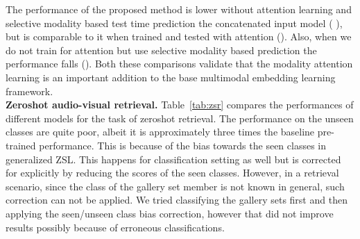 The performance of the proposed method is lower without attention learning and selective modality based test time prediction \cf the concatenated input model ( \vs ), but is comparable to it when trained and tested with attention (). Also, when we do not train for attention but use selective modality based prediction the performance falls (). Both these comparisons validate that the modality attention learning is an important addition to the base multimodal embedding learning framework.
\vspace{0.5em}\\
\textbf{Zeroshot audio-visual retrieval.}
Table~\ref{tab:zsr} compares the performances of different models for the task of zeroshot retrieval. 
The performance on the unseen classes are quite poor, albeit it is approximately three times the baseline pre-trained performance. This is because of the bias towards the seen classes in generalized ZSL. This happens for classification setting as well but is corrected for explicitly by reducing the scores of the seen classes. However, in a retrieval scenario, since the class of the gallery set member is not known in general, such correction can not be applied. We tried classifying the gallery sets first and then applying the seen/unseen class bias correction, however that did not improve results possibly because of erroneous classifications.

